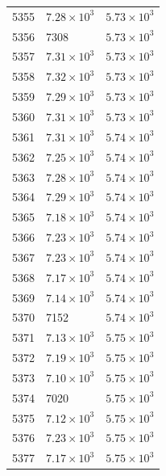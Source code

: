 \begin{table}[H]
\begin{tabular}{lll}
5355 & $\displaystyle 7.28 \times 10^{3}$ & $\displaystyle 5.73 \times 10^{3}$ \\
5356 & 7308 & $\displaystyle 5.73 \times 10^{3}$ \\
5357 & $\displaystyle 7.31 \times 10^{3}$ & $\displaystyle 5.73 \times 10^{3}$ \\
5358 & $\displaystyle 7.32 \times 10^{3}$ & $\displaystyle 5.73 \times 10^{3}$ \\
5359 & $\displaystyle 7.29 \times 10^{3}$ & $\displaystyle 5.73 \times 10^{3}$ \\
5360 & $\displaystyle 7.31 \times 10^{3}$ & $\displaystyle 5.73 \times 10^{3}$ \\
5361 & $\displaystyle 7.31 \times 10^{3}$ & $\displaystyle 5.74 \times 10^{3}$ \\
5362 & $\displaystyle 7.25 \times 10^{3}$ & $\displaystyle 5.74 \times 10^{3}$ \\
5363 & $\displaystyle 7.28 \times 10^{3}$ & $\displaystyle 5.74 \times 10^{3}$ \\
5364 & $\displaystyle 7.29 \times 10^{3}$ & $\displaystyle 5.74 \times 10^{3}$ \\
5365 & $\displaystyle 7.18 \times 10^{3}$ & $\displaystyle 5.74 \times 10^{3}$ \\
5366 & $\displaystyle 7.23 \times 10^{3}$ & $\displaystyle 5.74 \times 10^{3}$ \\
5367 & $\displaystyle 7.23 \times 10^{3}$ & $\displaystyle 5.74 \times 10^{3}$ \\
5368 & $\displaystyle 7.17 \times 10^{3}$ & $\displaystyle 5.74 \times 10^{3}$ \\
5369 & $\displaystyle 7.14 \times 10^{3}$ & $\displaystyle 5.74 \times 10^{3}$ \\
5370 & 7152 & $\displaystyle 5.74 \times 10^{3}$ \\
5371 & $\displaystyle 7.13 \times 10^{3}$ & $\displaystyle 5.75 \times 10^{3}$ \\
5372 & $\displaystyle 7.19 \times 10^{3}$ & $\displaystyle 5.75 \times 10^{3}$ \\
5373 & $\displaystyle 7.10 \times 10^{3}$ & $\displaystyle 5.75 \times 10^{3}$ \\
5374 & 7020 & $\displaystyle 5.75 \times 10^{3}$ \\
5375 & $\displaystyle 7.12 \times 10^{3}$ & $\displaystyle 5.75 \times 10^{3}$ \\
5376 & $\displaystyle 7.23 \times 10^{3}$ & $\displaystyle 5.75 \times 10^{3}$ \\
5377 & $\displaystyle 7.17 \times 10^{3}$ & $\displaystyle 5.75 \times 10^{3}$ \\

\end{tabular}
\end{table}
